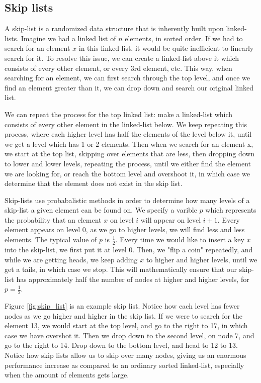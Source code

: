 \documentclass[oribibl]{llncs}
\begin{document}
\subsection{Skip lists}
A skip-list \cite{skip_list} is a randomized data structure that is inherently built upon linked-lists. Imagine we had a linked list of $n$ elements, in sorted order. If we had to search for an element $x$ in this linked-list, it would be quite inefficient to linearly search for it. To resolve this issue, we can create a linked-list above it which consists of every other element, or every 3rd element, etc. This way, when searching for an element, we can first search through the top level, and once we find an element greater than it, we can drop down and search our original linked list.

We can repeat the process for the top linked list: make a linked-list which consists of every other element in the linked-list below. We keep repeating this process, where each higher level has half the elements of the level below it, until we get a level which has 1 or 2 elements. Then when we search for an element x, we start at the top list, skipping over elements that are less, then dropping down to lower and lower levels, repeating the process, until we either find the element we are looking for, or reach the bottom level and overshoot it, in which case we determine that the element does not exist in the skip list.

Skip-lists use probabalistic methods in order to determine how many levels of a skip-list a given element can be found on. We specify a varible $p$ which represents the probability that an element $x$ on level $i$ will appear on level $i+1$. Every element appears on level 0, as we go to higher levels, we will find less and less elements. The typical value of $p$ is $\frac{1}{2}$. Every time we would like to insert a key $x$ into the skip-list, we first put it at level 0. Then, we "flip a coin" repeatedly, and while we are getting heads, we keep adding $x$ to higher and higher levels, until we get a tails, in which case we stop. This will mathematically ensure that our skip-list has approximately half the number of nodes at higher and higher levels, for $p=\frac{1}{2}$.

Figure \ref{fig:skip_list} is an example skip list. Notice how each level has fewer nodes as we go higher and higher in the skip list. If we were to search for the element 13, we would start at the top level, and go to the right to 17, in which case we have overshot it. Then we drop down to the second level, on node 7, and go to the right to 14. Drop down to the bottom level, and head to 12 to 13. Notice how skip lists allow us to skip over many nodes, giving us an enormous performance increase as compared to an ordinary sorted linked-list, especially when the amount of elements gets large.
\end{document}
